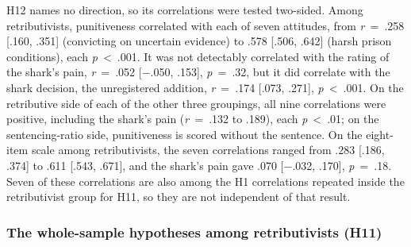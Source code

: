 H12 names no direction, so its correlations were tested two-sided. Among retributivists, punitiveness correlated with each of seven attitudes, from \emph{r}~=~.258 {[}.160, .351{]} (convicting on uncertain evidence) to .578 {[}.506, .642{]} (harsh prison conditions), each \emph{p}~\textless{}~.001. It was not detectably correlated with the rating of the shark's pain, \emph{r}~=~.052 {[}−.050, .153{]}, \emph{p}~=~.32, but it did correlate with the shark decision, the unregistered addition, \emph{r}~=~.174 {[}.073, .271{]}, \emph{p}~\textless{}~.001. On the retributive side of each of the other three groupings, all nine correlations were positive, including the shark's pain (\emph{r}~=~.132 to .189), each \emph{p}~\textless{}~.01; on the sentencing-ratio side, punitiveness is scored without the sentence. On the eight-item scale among retributivists, the seven correlations ranged from .283 {[}.186, .374{]} to .611 {[}.543, .671{]}, and the shark's pain gave .070 {[}−.032, .170{]}, \emph{p}~=~.18. Seven of these correlations are also among the H1 correlations repeated inside the retributivist group for H11, so they are not independent of that result.

\subsubsection{The whole-sample hypotheses among retributivists (H11)}\label{the-whole-sample-hypotheses-among-retributivists-h11}

